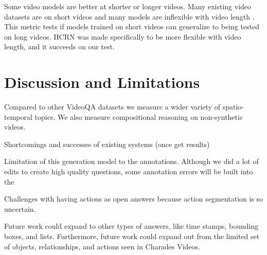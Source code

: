 \documentclass[10pt,twocolumn,letterpaper]{article}
\newcommand{\mgm}[1]{{\color{cyan}{mgm: #1}}}
\begin{document}
Some video models are better at shorter or longer videos. Many existing video datasets are on short videos and many models are inflexible with video length \cite{le2020hierarchical}. This metric tests if models trained on short videos can generalize to being tested on long videos. HCRN was made specifically to be more flexible with video length, and it succeeds on our test. 


\section{Discussion and Limitations}

\mgm{A lot of separate ideas here, need to find a coherent flow}

Compared to other VideoQA datasets we measure a wider variety of spatio-temporal topics. We also measure compositional reasoning on non-synthetic videos. 

Shortcomings and successes of existing systems (once get results)

Limitation of this generation model to the annotations. Although we did a lot of edits to create high quality questions, some annotation errors will be built into the 

Challenges with having actions as open answers because action segmentation is so uncertain.

Future work could expand to other types of answers, like time stamps, bounding boxes, and lists. Furthermore, future work could expand out from the limited set of objects, relationships, and actions seen in Charades Videos. 

{\small


}
\end{document}
